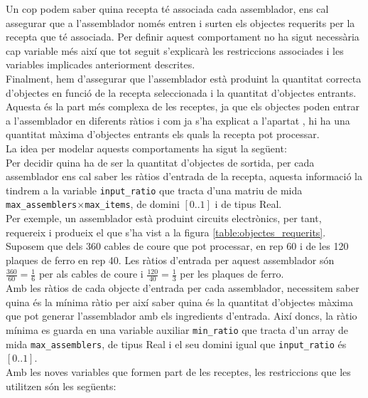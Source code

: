 Un cop podem saber quina recepta té associada cada assemblador, ens cal assegurar que a l'assemblador només entren i surten els objectes requerits per la recepta que té associada. Per definir aquest comportament no ha sigut necessària cap variable més així que tot seguit s'explicarà les restriccions associades i les variables implicades anteriorment descrites.\\

Finalment, hem d'assegurar que l'assemblador està produint la quantitat correcta d'objectes en funció de la recepta seleccionada i la quantitat d'objectes entrants. Aquesta és la part més complexa de les receptes, ja que els objectes poden entrar a l'assemblador en diferents ràtios i com ja s'ha explicat a l'apartat , hi ha una quantitat màxima d'objectes entrants els quals la recepta pot processar.\\
La idea per modelar aquests comportaments ha sigut la següent:\\
Per decidir quina ha de ser la quantitat d'objectes de sortida, per cada assemblador ens cal saber les ràtios d'entrada de la recepta, aquesta informació la tindrem a la variable \lstinline{input_ratio} que tracta d'una matriu de mida \lstinline{max_assemblers}$\times$\lstinline{max_items}, de domini $[0..1]$ i de tipus Real.\\
Per exemple, un assemblador està produint circuits electrònics, per tant, requereix i produeix el que s'ha vist a la figura \ref{table:objectes_requerits}. Suposem que dels 360 cables de coure que pot processar, en rep 60 i de les 120 plaques de ferro en rep 40. Les ràtios d'entrada per aquest assemblador són $\frac{360}{60}=\frac{1}{6}$ per als cables de coure i $\frac{120}{40}=\frac{1}{3}$ per les plaques de ferro.\\

Amb les ràtios de cada objecte d'entrada per cada assemblador, necessitem saber quina és la mínima ràtio per així saber quina és la quantitat d'objectes màxima que pot generar l'assemblador amb els ingredients d'entrada. Així doncs, la ràtio mínima es guarda en una variable auxiliar \lstinline{min_ratio} que tracta d'un array de mida \lstinline{max_assemblers}, de tipus Real i el seu domini igual que \lstinline{input_ratio} és $[0..1]$.\\


Amb les noves variables que formen part de les receptes, les restriccions que les utilitzen són les següents:

